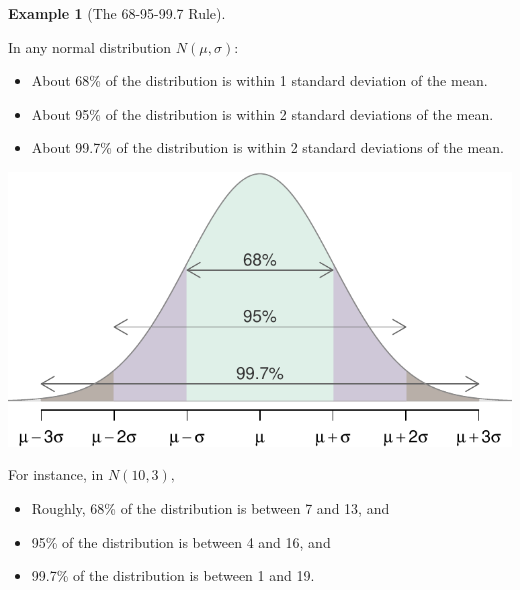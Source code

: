 \documentclass[
]{book}
\providecommand{\tightlist}{%
  \setlength{\itemsep}{0pt}\setlength{\parskip}{0pt}}
\theoremstyle{definition}
\theoremstyle{definition}
\newtheorem{example}{Example}[chapter]
\theoremstyle{definition}
\theoremstyle{definition}
\theoremstyle{remark}
\begin{document}
\begin{example}[The 68-95-99.7 Rule]
\protect\hypertarget{exm:normal-rule-of-thumb}{}\label{exm:normal-rule-of-thumb}

In any normal distribution \(N(\mu, \sigma)\):

\begin{itemize}
\tightlist
\item
  About 68\% of the distribution is within 1 standard deviation of the mean.
\item
  About 95\% of the distribution is within 2 standard deviations of the mean.
\item
  About 99.7\% of the distribution is within 2 standard deviations of the mean.
\end{itemize}

\includegraphics{math340-notes_files/figure-latex/unnamed-chunk-17-1.pdf}

For instance, in \(N(10,3),\)

\begin{itemize}
\tightlist
\item
  Roughly, 68\% of the distribution is between 7 and 13, and
\item
  95\% of the distribution is between 4 and 16, and
\item
  99.7\% of the distribution is between 1 and 19.
\end{itemize}

\end{example}
\end{document}
